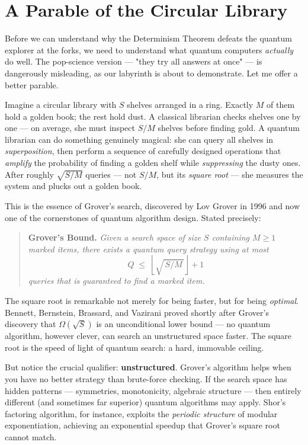 \documentclass[11pt,twoside,openright]{book}
\theoremstyle{definition}
\theoremstyle{remark}
\begin{document}
\section{A Parable of the Circular Library}

Before we can understand why the Determinism Theorem defeats the quantum explorer at the forks, we need to understand what quantum computers \textit{actually} do well. The pop-science version --- "they try all answers at once" --- is dangerously misleading, as our labyrinth is about to demonstrate. Let me offer a better parable.

Imagine a circular library with $S$ shelves arranged in a ring. Exactly $M$ of them hold a golden book; the rest hold dust. A classical librarian checks shelves one by one --- on average, she must inspect $S / M$ shelves before finding gold. A quantum librarian can do something genuinely magical: she can query all shelves in \textit{superposition}, then perform a sequence of carefully designed operations that \textit{amplify} the probability of finding a golden shelf while \textit{suppressing} the dusty ones. After roughly $\sqrt{S / M}$ queries --- not $S / M$, but its \textit{square root} --- she measures the system and plucks out a golden book.

This is the essence of Grover's search, discovered by Lov Grover in 1996 and now one of the cornerstones of quantum algorithm design. Stated precisely:

\begin{quote}
\textbf{Grover's Bound.} \textit{Given a search space of size $S$ containing $M \geq 1$ marked items, there exists a quantum query strategy using at most}
$$Q \;\leq\; \left\lfloor \sqrt{\,S / M\,} \right\rfloor + 1$$
\textit{queries that is guaranteed to find a marked item.}
\end{quote}
The square root is remarkable not merely for being faster, but for being \textit{optimal}. Bennett, Bernstein, Brassard, and Vazirani proved shortly after Grover's discovery that $\Omega(\sqrt{S})$ is an unconditional lower bound --- no quantum algorithm, however clever, can search an unstructured space faster. The square root is the speed of light of quantum search: a hard, immovable ceiling.

But notice the crucial qualifier: \textbf{unstructured}. Grover's algorithm helps when you have no better strategy than brute-force checking. If the search space has hidden patterns --- symmetries, monotonicity, algebraic structure --- then entirely different (and sometimes far superior) quantum algorithms may apply. Shor's factoring algorithm, for instance, exploits the \textit{periodic structure} of modular exponentiation, achieving an exponential speedup that Grover's square root cannot match.
\end{document}
